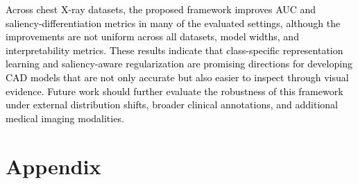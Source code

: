\documentclass[preprint,7pt, a4paper]{elsarticle}
\begin{document}
\textcolor{black}{Across chest X-ray datasets, the proposed framework improves AUC and saliency-differentiation metrics in many of the evaluated settings, although the improvements are not uniform across all datasets, model widths, and interpretability metrics. These results indicate that class-specific representation learning and saliency-aware regularization are promising directions for developing CAD models that are not only accurate but also easier to inspect through visual evidence. Future work should further evaluate the robustness of this framework under external distribution shifts, broader clinical annotations, and additional medical imaging modalities.}




\newpage

\appendix
{}
\section*{Appendix}




\end{document}
